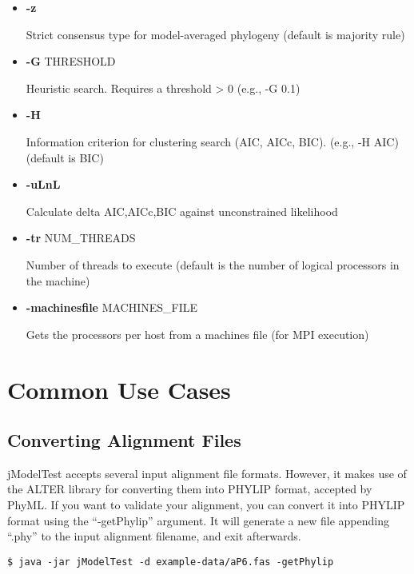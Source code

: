 \documentclass[11pt,twoside,a4paper]{article}
\begin{document}
\begin{itemize}
\item  {\bf -z}

Strict consensus type for model-averaged phylogeny (default is majority rule)

\item  {\bf -G} THRESHOLD

Heuristic search. Requires a threshold > 0 (e.g., -G 0.1)

\item  {\bf -H}

Information criterion for clustering search (AIC, AICc, BIC). (e.g., -H AIC) (default is BIC)

\item  {\bf -uLnL}

Calculate delta AIC,AICc,BIC against unconstrained likelihood

\item  {\bf -tr} NUM\_THREADS

Number of threads to execute (default is the number of logical processors in the machine)

\item  {\bf -machinesfile} MACHINES\_FILE

Gets the processors per host from a machines file (for MPI execution)

\end{itemize}


\section{Common Use Cases}

\subsection{Converting Alignment Files}

jModelTest accepts several input alignment file formats. However, it makes use of the ALTER library for converting them into PHYLIP format, accepted by PhyML. If you want to validate your alignment, you can convert it into PHYLIP format using the ``-getPhylip'' argument. It will generate a new file appending ``.phy'' to the input alignment filename, and exit afterwards.

\begin{lstlisting}
$ java -jar jModelTest -d example-data/aP6.fas -getPhylip
\end{lstlisting}
\end{document}
